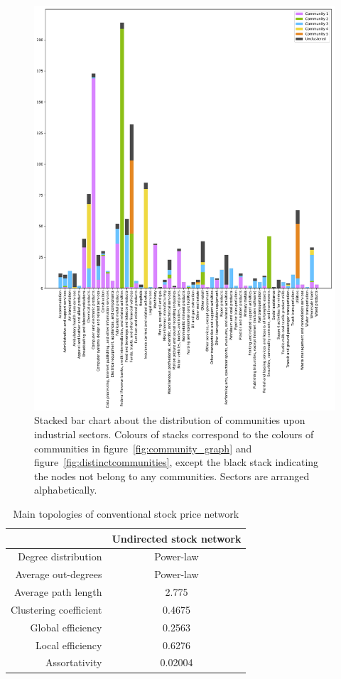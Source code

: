 \begin{figure} %
	\begin{center}
		\includegraphics[width=15cm]{community_sector_stacked}
	\end{center}
	\caption{Stacked bar chart about the distribution of communities upon industrial sectors. Colours of stacks correspond to the colours of communities in figure~\ref{fig:community_graph} and figure~\ref{fig:distinctcommunities}, except the black stack indicating the nodes not belong to any communities. Sectors are arranged alphabetically.}
	\label{fig:community_sector_stacked}
\end{figure}

\begin{table}
	\begin{center}
		\begin{tabular}{r|c}\hline\hline
			&Undirected stock network\\\hline
			Degree distribution&Power-law\\
			Average out-degrees&Power-law\\
			Average path length&2.775\\
			Clustering coefficient&0.4675\\
			Global efficiency&0.2563\\
			Local efficiency&0.6276\\
			Assortativity&0.02004\\
			\hline\hline
		\end{tabular}
	\end{center}
	\caption{Main topologies of conventional stock price network}\label{tab:conventional}
\end{table}

